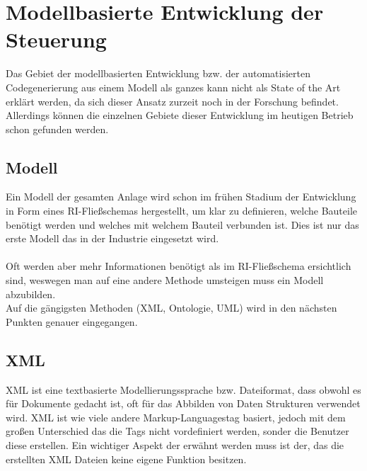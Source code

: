 \newpage

\section{Modellbasierte Entwicklung der Steuerung} \label{modellbasierte_entwicklung}
Das Gebiet der modellbasierten Entwicklung bzw. der automatisierten Codegenerierung aus einem Modell als ganzes kann nicht als State of the Art erklärt werden, da sich dieser Ansatz zurzeit noch in der Forschung befindet.\\
Allerdings können die einzelnen Gebiete dieser Entwicklung im heutigen Betrieb schon gefunden werden.
\subsection{Modell}
Ein Modell der gesamten Anlage wird schon im frühen Stadium der Entwicklung in Form eines RI-Fließschemas hergestellt, um klar zu definieren, welche Bauteile benötigt werden und welches mit welchem Bauteil verbunden ist. Dies ist nur das erste Modell das in der Industrie eingesetzt wird.\\
\\
Oft werden aber mehr Informationen benötigt als im RI-Fließschema ersichtlich sind, weswegen man auf eine andere Methode umsteigen muss ein Modell abzubilden.\\
Auf die gängigsten Methoden (XML, Ontologie, UML) wird in den nächsten Punkten genauer eingegangen.
\subsection{XML}
XML ist eine textbasierte Modellierungssprache bzw. Dateiformat, dass obwohl es für Dokumente gedacht ist, oft für das Abbilden von Daten Strukturen verwendet wird. XML ist wie viele andere \glqq Markup-Languages\grqq\space tag basiert, jedoch mit dem großen Unterschied das die Tags nicht vordefiniert werden, sonder die Benutzer diese erstellen. Ein wichtiger Aspekt der erwähnt werden muss ist der, das die erstellten XML Dateien keine eigene Funktion besitzen.\\

\newpage


